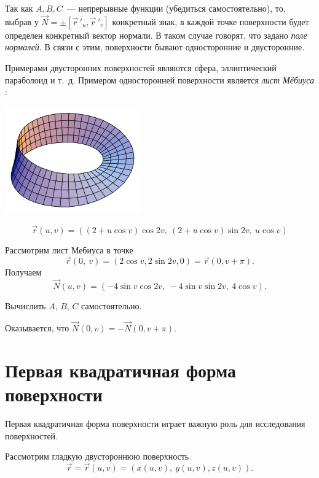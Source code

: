 \documentclass[../../main.tex]{subfiles}
\begin{document}
Так как $A, B, C$~--- непрерывные функции (убедиться самостоятельно), то, 
выбрав у $\vec{N} = \pm\left[ \vec r\,'_u, \vec r\,'_v \right]$ конкретный 
знак, в каждой точке поверхности будет определен конкретный вектор нормали. В 
таком случае говорят, что задано \emph{поле нормалей}. В связи с этим, 
поверхности бывают односторонние и двусторонние.

Примерами двусторонних поверхностей являются сфера, эллиптический параболоид и 
т.~д. Примером односторонней поверхности является \emph{лист Мёбиуса} :

\begin{center}
\includegraphics[scale = 0.5]{lec22_0.png}
\end{center}

\[\vec{r}(u, v) = ((2 + u\cos v)\cos2v, \ (2 + u\cos v)\sin2v, \ u\cos v)\]

Рассмотрим лист Мебиуса в точке
\[\vec{r}(0, \ v) = (2\cos v, 2\sin2v, 0) = \vec{r}(0, v + \pi).\]
Получаем
\[\vec{N}(u, v) = (-4\sin v\cos2v, \ -4\sin v\sin2v, \ 4\cos v).\] 

\begin{exc}
 Вычислить $A$, $B$, $C$ самостоятельно.
\end{exc}

\bigskip

Оказывается, что
$\vec{N}(0, v) = -\vec{N}(0, v + \pi).$

\section{Первая квадратичная форма поверхности}

Первая квадратичная форма поверхности играет важную роль для исследования 
поверхностей.

Рассмотрим гладкую двустороннюю поверхность \[\vec{r} = \vec{r}(u,  v) = 
(x(u,  v), \ y(u,  v), z(u,  v)).\]
\end{document}
